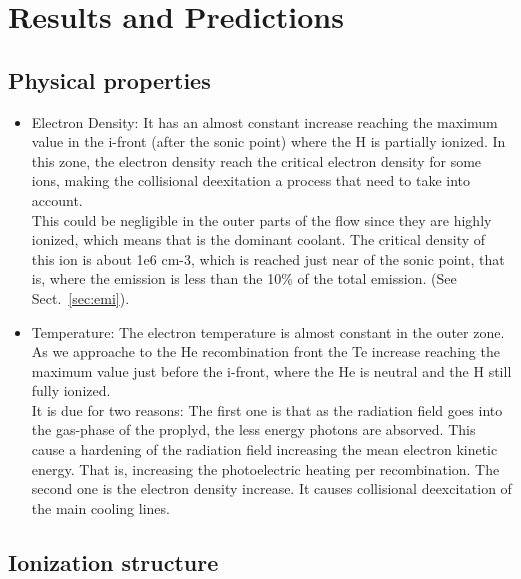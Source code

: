 \documentclass[aaspp]{article}
\begin{document}
\section{Results and Predictions}
\label{sec:results}



\subsection{Physical properties}
\label{sec:physical}

\begin{itemize}
  \item{Electron Density: It has an almost constant increase reaching
      the maximum value in the i-front (after the sonic point) where the H is partially
      ionized. In this zone, the electron density reach the critical
      electron density for some ions, making the collisional
      deexitation a process that need to take into account.\\
    This could be negligible in the outer parts of the flow since they
    are highly ionized, which means that \oiii is the dominant
    coolant. The critical density of this ion is about 1e6 cm-3, which
  is reached just near of the sonic point, that is, where the \oiii
  emission is less than the 10\% of the total \oiii emission. (See Sect.~\ref{sec:emi}).
}
  \item{Temperature: The electron temperature is almost constant in
      the outer zone. As we approache to the He recombination front
      the Te increase reaching the maximum value just before the
      i-front, where the He is neutral and the H still fully ionized. \\
    It is due for two reasons: The first one is that as the radiation
    field goes into the gas-phase of the proplyd, the less energy
    photons are absorved. This cause a hardening of the radiation
    field increasing the mean electron kinetic energy. That is,
    increasing the photoelectric heating per recombination. The second
  one is the electron density increase. It causes collisional
  deexcitation of the main cooling lines.
}
\end{itemize}

\subsection{Ionization structure}
\label{sec:ionization}
\end{document}
